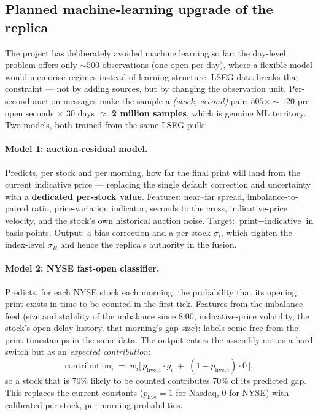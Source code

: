 \documentclass[11pt,a4paper]{article}
\begin{document}
\subsection{Planned machine-learning upgrade of the replica}

The project has deliberately avoided machine learning so far: the day-level
problem offers only $\sim$500 observations (one open per day), where a
flexible model would memorise regimes instead of learning structure. LSEG
data breaks that constraint --- not by adding sources, but by changing the
observation unit. Per-second auction messages make the sample a
\emph{(stock, second)} pair: $505 \times \sim 120$ pre-open seconds
$\times$ 30 days $\approx$ \textbf{2 million samples}, which is genuine ML
territory. Two models, both trained from the same LSEG pulls:

\paragraph{Model 1: auction-residual model.} Predicts, per stock and per
morning, how far the final print will land from the current indicative price
--- replacing the single default correction and uncertainty with a
\textbf{dedicated per-stock value}. Features: near--far spread,
imbalance-to-paired ratio, price-variation indicator, seconds to the cross,
indicative-price velocity, and the stock's own historical auction noise.
Target: $\text{print} - \text{indicative}$ in basis points. Output: a bias
correction and a per-stock $\sigma_i$, which tighten the index-level
$\sigma_R$ and hence the replica's authority in the fusion.

\paragraph{Model 2: NYSE fast-open classifier.} Predicts, for each NYSE
stock each morning, the probability that its opening print exists in time to
be counted in the first tick. Features from the imbalance feed (size and
stability of the imbalance since 8:00, indicative-price volatility, the
stock's open-delay history, that morning's gap size); labels come free from
the print timestamps in the same data. The output enters the assembly not as
a hard switch but as an \emph{expected contribution}:
\[
\text{contribution}_i \;=\; w_i \Big[\, p_{\text{live},i}\cdot g_i \;+\;
(1-p_{\text{live},i})\cdot 0 \,\Big],
\]
so a stock that is 70\% likely to be counted contributes 70\% of its
predicted gap. This replaces the current constants ($p_{\text{live}}=1$ for
Nasdaq, $0$ for NYSE) with calibrated per-stock, per-morning probabilities.
\end{document}
